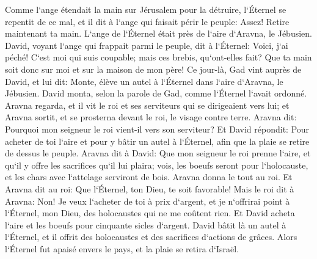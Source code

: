 \verse Comme l`ange étendait la main sur Jérusalem pour la détruire, l`Éternel se repentit de ce mal, et il dit à l`ange qui faisait périr le peuple: Assez! Retire maintenant ta main. L`ange de l`Éternel était près de l`aire d`Aravna, le Jébusien. 
\verse David, voyant l`ange qui frappait parmi le peuple, dit à l`Éternel: Voici, j`ai péché! C`est moi qui suis coupable; mais ces brebis, qu`ont-elles fait? Que ta main soit donc sur moi et sur la maison de mon père! 
\verse Ce jour-là, Gad vint auprès de David, et lui dit: Monte, élève un autel à l`Éternel dans l`aire d`Aravna, le Jébusien. 
\verse David monta, selon la parole de Gad, comme l`Éternel l`avait ordonné. 
\verse Aravna regarda, et il vit le roi et ses serviteurs qui se dirigeaient vers lui; et Aravna sortit, et se prosterna devant le roi, le visage contre terre. 
\verse Aravna dit: Pourquoi mon seigneur le roi vient-il vers son serviteur? Et David répondit: Pour acheter de toi l`aire et pour y bâtir un autel à l`Éternel, afin que la plaie se retire de dessus le peuple. 
\verse Aravna dit à David: Que mon seigneur le roi prenne l`aire, et qu`il y offre les sacrifices qu`il lui plaira; vois, les boeufs seront pour l`holocauste, et les chars avec l`attelage serviront de bois. 
\verse Aravna donna le tout au roi. Et Aravna dit au roi: Que l`Éternel, ton Dieu, te soit favorable! 
\verse Mais le roi dit à Aravna: Non! Je veux l`acheter de toi à prix d`argent, et je n`offrirai point à l`Éternel, mon Dieu, des holocaustes qui ne me coûtent rien. Et David acheta l`aire et les boeufs pour cinquante sicles d`argent. 
\verse David bâtit là un autel à l`Éternel, et il offrit des holocaustes et des sacrifices d`actions de grâces. Alors l`Éternel fut apaisé envers le pays, et la plaie se retira d`Israël. 
